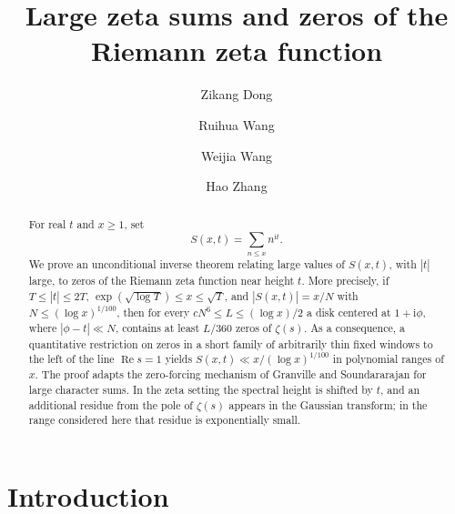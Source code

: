 \documentclass[12pt,reqno]{amsart}
\theoremstyle{remark}
\numberwithin{equation}{section}
\newcommand{\Ree}{\operatorname{Re}}
\newcommand{\ii}{\mathrm i}
\begin{document}
\title[Large zeta sums]{Large zeta sums and zeros of the Riemann zeta function}

\author{Zikang Dong}
\author{Ruihua Wang}
\author{Weijia Wang}
\author{Hao Zhang}

\address[Zikang Dong]{School of Mathematical Sciences, Soochow University, Suzhou 215006, P. R. China}
\address[Ruihua Wang]{School of Fundamental Sciences, Hainan Bielefeld University of Applied Sciences, Danzhou 578101, P. R. China}
\address[Weijia Wang]{School of Mathematics, Shandong University, Jinan 250010, P. R. China}
\address[Hao Zhang]{School of Mathematics, Hunan University, Changsha 410082, P. R. China}


\date{}

\begin{abstract}
For real $t$ and $x\ge 1$, set
\[
S(x,t)=\sum_{n\le x} n^{\ii t}.
\]
We prove an unconditional inverse theorem relating large values of $S(x,t)$, with $|t|$ large, to zeros of the Riemann zeta function near height $t$.  More precisely, if $T\le |t|\le 2T$, $\exp(\sqrt{\log T})\le x\le \sqrt T$, and $|S(x,t)|=x/N$ with $N\le (\log x)^{1/100}$, then for every $cN^6\le L\le (\log x)/2$ a disk centered at $1+\ii\phi$, where $|\phi-t|\ll N$, contains at least $L/360$ zeros of $\zeta(s)$.  As a consequence, a quantitative restriction on zeros in a short family of arbitrarily thin fixed windows to the left of the line $\Ree s=1$ yields $S(x,t)\ll x/(\log x)^{1/100}$ in polynomial ranges of $x$.  The proof adapts the zero-forcing mechanism of Granville and Soundararajan for large character sums.  In the zeta setting the spectral height is shifted by $t$, and an additional residue from the pole of $\zeta(s)$ appears in the Gaussian transform; in the range considered here that residue is exponentially small.
\end{abstract}


\maketitle

\section{Introduction}
\end{document}
